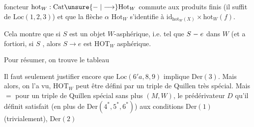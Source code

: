 foncteur $\mathrm{hot}_W:\mathrm{Cat}\unsure{\relbar|\longrightarrow}\mathrm{Hot}_W$ commute aux produits finis (il suffit de $\mathrm{Loc}(1,2,3)$) et que la flèche $\alpha$  $\mathrm{Hot}_W$ s'identifie à $\mathrm{id}_{\mathrm{hot}_W(X)}\times\mathrm{hot}_W(f)$.

Cela montre  que si $S$ est un objet $W$-asphérique, i.e. tel que $S\relbar e$  dans $W$ (et a fortiori, si $S$  , alors $S\longrightarrow e$ est $\mathrm{HOT}_W$ asphérique. 

Pour résumer, on trouve le tableau

 Il faut seulement justifier encore que $\mathrm{Loc}(6'a,8,9)$ implique $\mathrm{Der}(3)$. Mais alors, on l'a vu, $\mathrm{HOT}_W$ peut être défini par un triple de Quillen très spécial. Mais \ensuremath{=} pour un triple de Quillen spécial sans plus $(M,W)$, le prédérivateur $D$ qu'il définit satisfait (en plus de $\mathrm{Der}(4^*,5^*,6^*)$) aux conditions $\mathrm{Der}(1)$ (trivialement), $\mathrm{Der}(2)$
